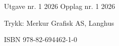 



\pagestyle{empty}
Utgave nr. 1 2026 \os
Opplag nr. 1 2026 \vsk


Trykk: Merkur Grafisk AS, Langhus\vsk

ISBN 978-82-694462-1-0 \vsk


\lic

\newpage	



